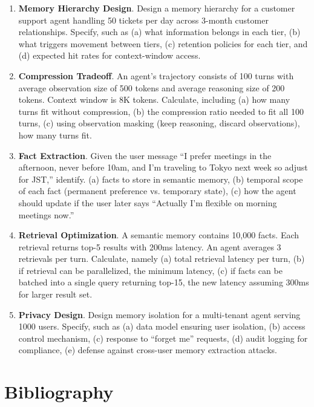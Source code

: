 \begin{enumerate}
\item \textbf{Memory Hierarchy Design}. Design a memory hierarchy for a customer support agent handling 50 tickets per day across 3-month customer relationships. Specify, such as (a) what information belongs in each tier, (b) what triggers movement between tiers, (c) retention policies for each tier, and (d) expected hit rates for context-window access.

\item \textbf{Compression Tradeoff}. An agent's trajectory consists of 100 turns with average observation size of 500 tokens and average reasoning size of 200 tokens. Context window is 8K tokens. Calculate, including (a) how many turns fit without compression, (b) the compression ratio needed to fit all 100 turns, (c) using observation masking (keep reasoning, discard observations), how many turns fit.

\item \textbf{Fact Extraction}. Given the user message ``I prefer meetings in the afternoon, never before 10am, and I'm traveling to Tokyo next week so adjust for JST,'' identify. (a) facts to store in semantic memory, (b) temporal scope of each fact (permanent preference vs. temporary state), (c) how the agent should update if the user later says ``Actually I'm flexible on morning meetings now.''

\item \textbf{Retrieval Optimization}. A semantic memory contains 10,000 facts. Each retrieval returns top-5 results with 200ms latency. An agent averages 3 retrievals per turn. Calculate, namely (a) total retrieval latency per turn, (b) if retrieval can be parallelized, the minimum latency, (c) if facts can be batched into a single query returning top-15, the new latency assuming 300ms for larger result set.

\item \textbf{Privacy Design}. Design memory isolation for a multi-tenant agent serving 1000 users. Specify, such as (a) data model ensuring user isolation, (b) access control mechanism, (c) response to ``forget me'' requests, (d) audit logging for compliance, (e) defense against cross-user memory extraction attacks.
\end{enumerate}

\section*{Bibliography}

